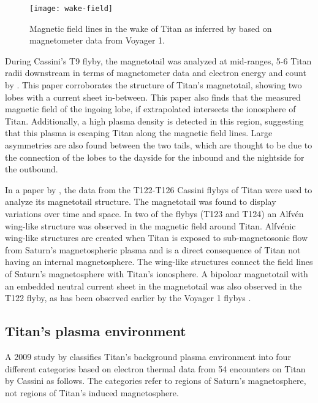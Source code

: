\documentclass[12pt, parskip=full*, abstract]{scrartcl}
\begin{document}
\begin{figure}[htbp]
	\centering
	\texttt{[image: wake-field]}
	\caption{Magnetic field lines in the wake of Titan as inferred by \textcite{ness-1982} based on magnetometer data from Voyager 1.}
	\label{fig:wake-field}
\end{figure}

During Cassini's T9 flyby, the magnetotail was analyzed at mid-ranges, 5-6 Titan radii downstream in terms of magnetometer data and electron energy and count by \textcite{Magnetotail-T9}. This paper corroborates the structure of Titan's magnetotail, showing two lobes with a current sheet in-between. This paper also finds that the measured magnetic field of the ingoing lobe, if extrapolated intersects the ionosphere of Titan. Additionally, a high plasma density is detected in this region, suggesting that this plasma is escaping Titan along the magnetic field lines. Large asymmetries are also found
between the two tails, which are thought to be due to the connection of the lobes to the dayside for the inbound and the nightside for the outbound.

In a paper by \textcite{alfven-wing-structure}, the data from the T122-T126 Cassini flybys of Titan were used to analyze its magnetotail structure. The magnetotail was found to display variations over time and space. In two of the flybys (T123 and T124) an Alfvén wing-like structure was observed in the magnetic field around Titan. Alfvénic wing-like structures are created when Titan is exposed to sub-magnetosonic flow from Saturn's magnetospheric plasma and is a direct consequence of Titan not having an internal magnetosphere. The wing-like structures connect the field lines of Saturn's magnetosphere with Titan's ionosphere. A bipoloar magnetotail with an embedded neutral current sheet in the magnetotail was also observed in the T122 flyby, as has been observed earlier by the Voyager 1 flybys \parencite{ness-1982}.

\subsection{Titan's plasma environment}
A 2009 study by \textcite{Rymer-class} classifies Titan's background plasma environment into four different categories based on electron thermal data from 54 encounters on Titan by Cassini as follows. The categories refer to regions of Saturn's magnetosphere, not regions of Titan's induced magnetosphere. 
\end{document}
